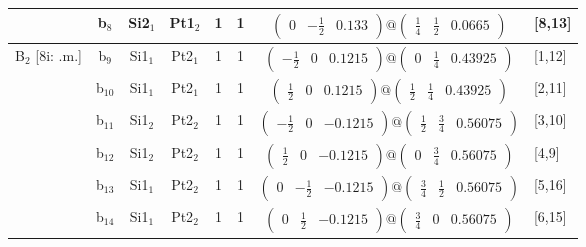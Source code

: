\documentclass[fleqn,10pt,landscape]{article}
\begin{document}
\begin{itemize}
\begin{center}
\begin{longtable}{cc|cc|c|c|c|l}
& b$_{8}$ & Si2$_{1}$ & Pt1$_{2}$ & 1 & 1 & $\begin{pmatrix} 0 & - \frac{1}{2} & 0.133 \end{pmatrix}@\begin{pmatrix} \frac{1}{4} & \frac{1}{2} & 0.0665 \end{pmatrix}$ & [8,13] \\ \hline
B$_{2}$ [8i: .m.] & b$_{9}$ & Si1$_{1}$ & Pt2$_{1}$ & 1 & 1 & $\begin{pmatrix} - \frac{1}{2} & 0 & 0.1215 \end{pmatrix}@\begin{pmatrix} 0 & \frac{1}{4} & 0.43925 \end{pmatrix}$ & [1,12] \\
& b$_{10}$ & Si1$_{1}$ & Pt2$_{1}$ & 1 & 1 & $\begin{pmatrix} \frac{1}{2} & 0 & 0.1215 \end{pmatrix}@\begin{pmatrix} \frac{1}{2} & \frac{1}{4} & 0.43925 \end{pmatrix}$ & [2,11] \\
& b$_{11}$ & Si1$_{2}$ & Pt2$_{2}$ & 1 & 1 & $\begin{pmatrix} - \frac{1}{2} & 0 & -0.1215 \end{pmatrix}@\begin{pmatrix} \frac{1}{2} & \frac{3}{4} & 0.56075 \end{pmatrix}$ & [3,10] \\
& b$_{12}$ & Si1$_{2}$ & Pt2$_{2}$ & 1 & 1 & $\begin{pmatrix} \frac{1}{2} & 0 & -0.1215 \end{pmatrix}@\begin{pmatrix} 0 & \frac{3}{4} & 0.56075 \end{pmatrix}$ & [4,9] \\
& b$_{13}$ & Si1$_{1}$ & Pt2$_{2}$ & 1 & 1 & $\begin{pmatrix} 0 & - \frac{1}{2} & -0.1215 \end{pmatrix}@\begin{pmatrix} \frac{3}{4} & \frac{1}{2} & 0.56075 \end{pmatrix}$ & [5,16] \\
& b$_{14}$ & Si1$_{1}$ & Pt2$_{2}$ & 1 & 1 & $\begin{pmatrix} 0 & \frac{1}{2} & -0.1215 \end{pmatrix}@\begin{pmatrix} \frac{3}{4} & 0 & 0.56075 \end{pmatrix}$ & [6,15] \\

\end{longtable}
\end{center}
\end{itemize}
\end{document}
